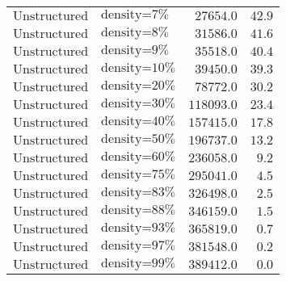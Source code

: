 \begin{longtable}{llrr}
$\text{Unstructured}$ & $\text{density=7\%}$ & $27654.0$ & $42.9$\\
$\text{Unstructured}$ & $\text{density=8\%}$ & $31586.0$ & $41.6$\\
$\text{Unstructured}$ & $\text{density=9\%}$ & $35518.0$ & $40.4$\\
$\text{Unstructured}$ & $\text{density=10\%}$ & $39450.0$ & $39.3$\\
$\text{Unstructured}$ & $\text{density=20\%}$ & $78772.0$ & $30.2$\\
$\text{Unstructured}$ & $\text{density=30\%}$ & $118093.0$ & $23.4$\\
$\text{Unstructured}$ & $\text{density=40\%}$ & $157415.0$ & $17.8$\\
$\text{Unstructured}$ & $\text{density=50\%}$ & $196737.0$ & $13.2$\\
$\text{Unstructured}$ & $\text{density=60\%}$ & $236058.0$ & $9.2$\\
$\text{Unstructured}$ & $\text{density=75\%}$ & $295041.0$ & $4.5$\\
$\text{Unstructured}$ & $\text{density=83\%}$ & $326498.0$ & $2.5$\\
$\text{Unstructured}$ & $\text{density=88\%}$ & $346159.0$ & $1.5$\\
$\text{Unstructured}$ & $\text{density=93\%}$ & $365819.0$ & $0.7$\\
$\text{Unstructured}$ & $\text{density=97\%}$ & $381548.0$ & $0.2$\\
$\text{Unstructured}$ & $\text{density=99\%}$ & $389412.0$ & $0.0$\\
\end{longtable}


